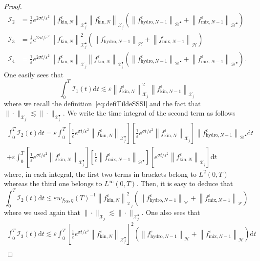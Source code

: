 \documentclass[AHL,Unicode,longabstracts,published]{cedram}
\newcommand{\ns}{\mathrm{NS}}
\newcommand{\hyd}{\mathrm{hydro}}
\newcommand{\mix}{\mathrm{mix}}
\newcommand{\kin}{\mathrm{kin}}
\renewcommand{\d}{\mathrm{d}}
\newcommand{\XX}{\mathcal{X}}
\newcommand{\HH}{\mathcal{H}}
\newcommand{\FFF}{\mathscr{F}}
\newcommand{\HHH}{\mathscr{H}}
\newcommand{\GGG}{\mathscr{X}}
\newcommand{\scI}{\mathscr{I}}
\newcommand{\SSs}{\HH}
\newcommand{\SSsp}{\HH^{\bullet}}
\newcommand{\SSSs}{\HHH}
\newcommand{\SSh}{\bm{\XX}}
\newcommand{\SShp}{\bm{\XX}^{\bullet}}
\newcommand{\SSSh}{\pmb{\GGG}}
\newcommand{\SSSm}{\FFF}
\newcommand*\eps{{\varepsilon}}
\begin{document}
\begin{proof}
\begin{align*}
\scI_2 &= \frac{1}{\eps} e^{2 \sigma t / \eps^2} \left\| f^\eps_{\kin, N}\right\|_{\SShp_{j}} \left\| f^\eps_{\kin, N}\right\|_{\SSh_j} \left(\left\| f^\eps_{\hyd, N-1}\right\|_{\SSsp} + \left\| f^\eps_{\mix, N-1}\right\|_{\SSsp} \right) \\
\scI_3 &=\frac{1}{\eps} e^{2 \sigma t / \eps^2} \left\| f^\eps_{\kin, N}\right\|_{\SShp_{j}}^2 \left(\left\| f^\eps_{\hyd, N-1} \right\|_{\SSs} + \left\| f^\eps_{\mix, N-1}\right\|_{\SSs} \right) \\
\scI_4&=\frac{1}{\eps} e^{2 \sigma t / \eps^2} \left\| f^\eps_{\kin, N}\right\|_{\SSh_j} \left\| f^\eps_{\kin, N}\right\|_{\SShp_{j}} \left(\left\| f^\eps_{\hyd, N-1}\right\|_{\SSsp} + \left\| f^\eps_{\mix, N-1}\right\|_{\SSsp} \right).
\end{align*}
One easily sees that
\[
\int_0^T\scI_1(t) \d t \lesssim \eps \left\| f_{\kin,N}^\eps\right\|_{\SSSh_j}^2\,\left\| f_{\kin,N-1}^\eps\right\|_{\SSSh_j}
\]
where we recall the definition~\eqref{eq:defiTildeSSSl} and the fact that $\|\cdot\|_{\SSh_j} \lesssim \|\cdot\|_{\SShp_{j}}$. We write the time integral of the second term as follows
\begin{multline*}
\int_0^T \scI_2(t)\d t=\eps \int_0^T \left[\frac{1}{\eps} e^{\sigma t / \eps^2} \left\| f^\eps_{\kin, N} \right\|_{\SShp_{j}} \right] \left[\frac{1}{\eps} e^{\sigma t / \eps^2 } \left\| f^\eps_{\kin, N}\right\|_{\SSh_j} \right] \left\| f^\eps_{\hyd, N-1} \right\|_{\SSsp} \d t\\
+\eps \int_0^T \left[\frac{1}{\eps} e^{\sigma t / \eps^2} \left\| f^\eps_{\kin, N}\right\|_{\SShp_{j}} \right]\left[\frac{1}{\eps}\left\| f^\eps_{\mix, N-1} \right\|_{\SSsp} \right] \left[e^{\sigma t / \eps^2 } \left\| f^\eps_{\kin, N}\right\|_{\SSh_j} \right] \d t
\end{multline*}
where, in each integral, the first two terms in brackets belong to $L^2(0,T)$ whereas the third one belongs to $L^\infty(0,T)$. Then, it is easy to deduce that
\[
\int_0^T \scI_2(t) \d t\lesssim \eps w_{ f_\ns, \eta }(T)^{-1} \left\| f^\eps_{\kin, N} \right\|^2_{\SSSh_j} \left(\left\| f^\eps_{\hyd, N-1}\right\|_\SSSs + \left\| f^\eps_{\mix, N-1}\right\|_\SSSm \right)\,
\]
where we used again that $\|\cdot\|_{\SSh_j} \lesssim \|\cdot\|_{\SShp_{j}}$. One also sees that
\begin{multline*}
\int_0^T\scI_3(t)\d t \lesssim
\eps \int_0^T \left[\frac{1}{\eps} e^{\sigma t / \eps^2} \left\| f^\eps_{\kin, N}\right\|_{\SShp_{j}} \right]^2 \left(\left\| f^\eps_{\hyd, N-1}\right\|_{\SSs} + \left\| f^\eps_{\mix, N-1}\right\|_{\SSs} \right) \d t \\

\end{multline*}
\end{proof}
\end{document}
